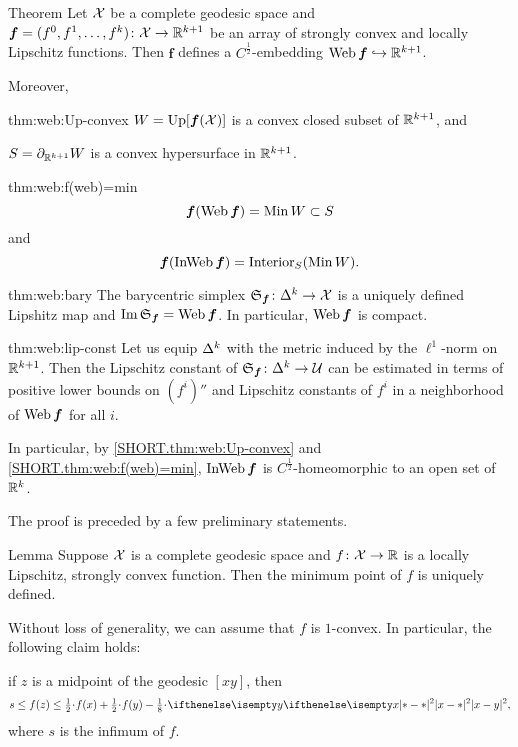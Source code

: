 \begin{thm}{Theorem}\label{thm:web}
Let $\mathcal{X}$ be a complete geodesic space 
and $\bm{f}\z=(f^0,f^1,\dots,f^\kay)\:\spc{X}\to\RR^{\kay+1}$ 
be an array of strongly convex and locally Lipschitz functions.
Then $\bm{f}$ defines a $C^{\frac12}$-embedding 
$\Web\bm{f}\hookrightarrow\RR^{\kay+1}$.

Moreover,
\begin{subthm}{thm:web:Up-convex}
$W=\mathop{\rm Up}\nolimits[\bm{f}(\mathcal{X})]$ is a convex closed subset of $\mathbb{R}^{k+1}$,
and

$S=\partial_{\mathbb{R}^{k+1}} W$ is a convex hypersurface in $\mathbb{R}^{k+1}$.
\end{subthm}

\begin{subthm}{thm:web:f(web)=min}
\[\bm{f}(\Web\bm{f})=\Min W \subset S\]
and
\[\bm{f}(\mathop{\rm InWeb}\nolimits\bm{f})= \mathop{\rm Interior}\nolimits_{S}(\mathop{\rm Min}\nolimits W).\]
\end{subthm}

\begin{subthm}{thm:web:bary}
The barycentric simplex 
$\spx{\bm{f}}\:\Delta^\kay\to \spc{X}$ is a uniquely defined Lipshitz map and $\mathop{\rm Im}\nolimits\mathfrak{S}_{\bm{f}}=\mathop{\rm Web}\nolimits\bm{f}$.
In particular, $\mathop{\rm Web}\nolimits\bm{f}$ is compact.
\end{subthm}

\begin{subthm}{thm:web:lip-const}
Let us equip $\Delta^k$ with the metric induced by the $\ell^1$-norm on $\mathbb{R}^{k+1}$.
Then the Lipschitz constant of $\spx{\bm{f}}\:\Delta^\kay\to\spc{U}$ can be estimated in terms of 
positive lower bounds on $(f^i)''$ 
and Lipschitz constants of $f^i$
in a neighborhood of $\mathop{\rm Web}\nolimits\bm{f}$ for all $i$.
\end{subthm}


In particular, by \ref{SHORT.thm:web:Up-convex} and \ref{SHORT.thm:web:f(web)=min}, $\mathop{\rm InWeb}\nolimits\bm{f}$ is $C^{\frac12}$-homeomorphic to an open set of $\mathbb{R}^k$.
\end{thm}

The proof is preceded by a few preliminary statements.

\begin{thm}{Lemma}\label{lem:argmin(convex)}
Suppose $\mathcal{X}$ is a complete geodesic space and $f\:\spc{X}\to\RR$ is a locally Lipschitz, strongly convex function. Then the minimum point 
of $f$
is uniquely defined.
\end{thm}

Without loss of generality, we can assume that $f$ is $1$-convex.
In particular, the following claim holds:
\begin{clm}{}\label{midpoint}
 if $z$ is a midpoint of the geodesic $[x y]$, then 
\[s\le f(z)
\le
\tfrac{1}{2}\cdot f(x)+\tfrac{1}{2}\cdot f(y)-\tfrac{1}{8}\cdot\dist[2]{x}{y}{},
\]
where $s$ is the infimum of $f$.
\end{clm}

